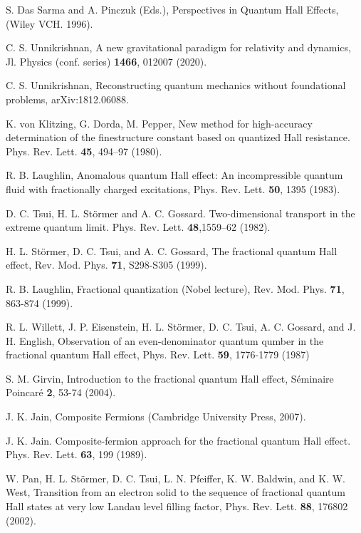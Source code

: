 \documentclass[aps,preprint,12pt,tightenlines]{revtex4}%
\begin{document}
\begin{thebibliography}{99}                                                                                               %
S. Das Sarma and A. Pinczuk (Eds.), Perspectives in Quantum
Hall Effects, (Wiley VCH. 1996).

C. S. Unnikrishnan, A new gravitational paradigm for
relativity and dynamics, Jl. Physics (conf. series) \textbf{1466}, 012007 (2020).

C. S. Unnikrishnan, Reconstructing quantum mechanics
without foundational problems, arXiv:1812.06088.

K. von Klitzing, G. Dorda, M. Pepper, New method for
high-accuracy determination of the finestructure constant based on quantized
Hall resistance. Phys. Rev. Lett. \textbf{45}, 494--97 (1980).

R. B. Laughlin, Anomalous quantum Hall effect: An
incompressible quantum fluid with fractionally charged excitations, Phys. Rev.
Lett. \textbf{50}, 1395 (1983).

D. C. Tsui, H. L. St\"{o}rmer and A. C. Gossard.
Two-dimensional transport in the extreme quantum limit. Phys. Rev. Lett.
\textbf{48},1559--62 (1982).

H. L. St\"{o}rmer, D. C. Tsui, and A. C. Gossard, The
fractional quantum Hall effect, Rev. Mod. Phys. \textbf{71}, S298-S305 (1999).

R. B. Laughlin, Fractional quantization (Nobel
lecture), Rev. Mod. Phys. \textbf{71}, 863-874 (1999).

R. L. Willett, J. P. Eisenstein, H. L. St\"{o}rmer, D.
C. Tsui, A. C. Gossard, and J. H. English, Observation of an even-denominator
quantum qumber in the fractional quantum Hall effect, Phys. Rev. Lett.
\textbf{59}, 1776-1779 (1987)

S. M. Girvin, Introduction to the fractional quantum Hall
effect, S\'{e}minaire Poincar\'{e} \textbf{2}, 53-74 (2004).

J. K. Jain, Composite Fermions (Cambridge University
Press, 2007).

J. K. Jain. Composite-fermion approach for the fractional
quantum Hall effect. Phys. Rev. Lett. \textbf{63}, 199 (1989).

W. Pan, H. L. St\"{o}rmer, D. C. Tsui, L. N. Pfeiffer,
K. W. Baldwin, and K. W. West, Transition from an electron solid to the
sequence of fractional quantum Hall states at very low Landau level filling
factor, Phys. Rev. Lett. \textbf{88}, 176802 (2002).


\end{thebibliography}
\end{document}
